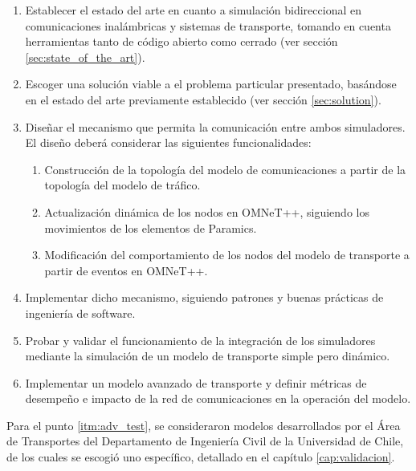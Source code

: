 \begin{enumerate}
    \item Establecer el estado del arte en cuanto a simulación bidireccional en comunicaciones inalámbricas y sistemas de transporte, tomando en cuenta herramientas tanto de código abierto como cerrado (ver sección \ref{sec:state_of_the_art}).
    \item Escoger una solución viable a el problema particular presentado, basándose en el estado del arte previamente establecido (ver sección \ref{sec:solution}).
    \item Diseñar el mecanismo que permita la comunicación entre ambos simuladores.\\
    El diseño deberá considerar las siguientes funcionalidades:
    \begin{enumerate}
        \item Construcción de la topología del modelo de comunicaciones a partir de la topología del modelo de tráfico.
        \item Actualización dinámica de los nodos en OMNeT++, siguiendo los movimientos de los elementos de Paramics.
        \item Modificación del comportamiento de los nodos del modelo de transporte a partir de eventos en OMNeT++.
    \end{enumerate}
    \item Implementar dicho mecanismo, siguiendo patrones y buenas prácticas de ingeniería de software.
    \item \label{itm:simple_test} Probar y validar el funcionamiento de la integración de los simuladores mediante la simulación de un modelo de transporte simple pero dinámico.
    
    \item \label{itm:adv_test} Implementar un modelo avanzado de transporte y definir métricas de desempeño e impacto de la red de comunicaciones en la operación del modelo.
\end{enumerate}

Para el punto \ref{itm:adv_test}, se consideraron modelos desarrollados por el Área de Transportes del Departamento de Ingeniería Civil de la Universidad de Chile, de los cuales se escogió uno específico, detallado en el capítulo \ref{cap:validacion}.